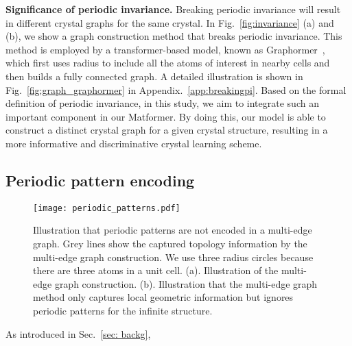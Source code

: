 \documentclass{article}
\begin{document}
\textbf{Significance of periodic invariance.} Breaking periodic invariance will result in different crystal graphs for the same crystal.
In Fig.~\ref{fig:invariance} (a) and (b), we show a graph construction method that breaks periodic invariance. This method
is employed by a transformer-based model, known as Graphormer~\citep{graphormer}, which first uses radius to include all the atoms of interest in nearby cells and then builds a fully connected graph. A detailed illustration is shown in Fig.~\ref{fig:graph_graphormer} in Appendix.~\ref{app:breakingpi}.
Based on the formal definition of periodic invariance,
in this study, we aim to integrate such an important component in our Matformer.
By doing this, our model is able to construct a distinct crystal graph for a given crystal structure,
resulting in a more informative and discriminative crystal learning scheme.





















\subsection{Periodic pattern encoding} \label{sec:ppe}
\label{sec:periodic_patterns}
\begin{wrapfigure}[17]{r}{0.5\linewidth}
    \vspace{-40 pt}
    \begin{center}
        \texttt{[image: periodic\_patterns.pdf]}
    \end{center}
    \vspace{-10 pt}
    \caption{
    Illustration that periodic patterns are not encoded in 
    a multi-edge graph. Grey lines show the captured topology information by the multi-edge graph construction. We use three radius circles because there are three atoms in a unit cell. (a). Illustration of the multi-edge graph construction. (b). Illustration that the multi-edge graph method only captures local geometric information but ignores periodic patterns for the infinite structure.
    }
    \label{fig:periodic}
\end{wrapfigure}
As introduced in Sec.~\ref{sec: backg},
\end{document}
